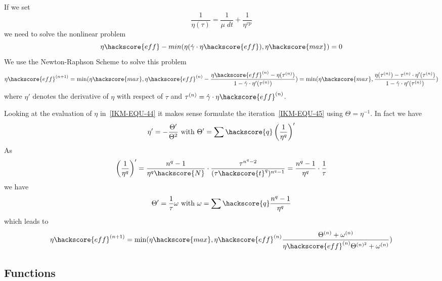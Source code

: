 If we set 
\begin{equation}\label{IKM-EQU-44}
\frac{1}{\eta(\tau)}= \frac{1}{\mu \; dt}+\frac{1}{\eta^{vp}}
\end{equation}
we need to solve the nonlinear problem
\begin{equation}
\eta\hackscore{eff} -  min(\eta( \dot{\gamma} \cdot \eta\hackscore{eff}) 
, \eta\hackscore{max}) =0 
\end{equation}
We use the Newton-Raphson Scheme  to solve this problem
\begin{equation}\label{IKM-EQU-45}
\eta\hackscore{eff}^{(n+1)} = \min(\eta\hackscore{max}, 
\eta\hackscore{eff}^{(n)} -
\frac{\eta\hackscore{eff}^{(n)} - \eta( \tau^{(n)}) }
{1-\dot{\gamma} \cdot \eta'( \tau^{(n)} )} )
=\min(\eta\hackscore{max},
\frac{\eta( \tau^{(n)}) -\tau^{(n)} \cdot  \eta'( \tau^{(n)} )  }
{1-\dot{\gamma} \cdot \eta'( \tau^{(n)} )} )
\end{equation} 
where $\eta'$ denotes the derivative of $\eta$ with respect of $\tau$
and $\tau^{(n)} =  \dot{\gamma} \cdot \eta\hackscore{eff}^{(n)}$. 

Looking at the evaluation of $\eta$ in~\ref{IKM-EQU-44} it makes sense formulate
the iteration~\ref{IKM-EQU-45} using $\Theta=\eta^{-1}$. 
In fact we have 
\begin{equation}
\eta' = - \frac{\Theta'}{\Theta^2} 
\mbox{ with } 
\Theta' = \sum\hackscore{q} \left(\frac{1}{\eta^{q}} \right)'
\label{IKM iteration 7}
\end{equation} 
As
\begin{equation}\label{IKM-EQU-47}
\left(\frac{1}{\eta^{q}} \right)'
= \frac{n^{q}-1}{\eta^{q}\hackscore{N}} \cdot \frac{\tau^{n^{q}-2}}{(\tau\hackscore{t}^q)^{n^{q}-1}}
= \frac{n^{q}-1}{\eta^{q}}\cdot\frac{1}{\tau} 
\end{equation}
we have
\begin{equation}\label{IKM-EQU-48}
\Theta' = \frac{1}{\tau} \omega \mbox{ with } \omega = \sum\hackscore{q}\frac{n^{q}-1}{\eta^{q}} 
\end{equation}
which leads to 
\begin{equation}\label{IKM-EQU-49}
\eta\hackscore{eff}^{(n+1)} = \min(\eta\hackscore{max}, 
\eta\hackscore{eff}^{(n)}
\frac{\Theta^{(n)}  + \omega^{(n)}  }
{\eta\hackscore{eff}^{(n)} \Theta^{(n)^2}+\omega^{(n)} })
\end{equation} 


\subsection{Functions}


